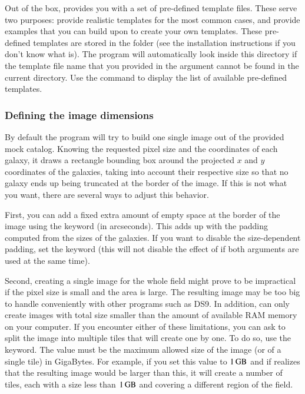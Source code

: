 Out of the box, \egg provides you with a set of pre-defined template files. These serve two purposes: provide realistic templates for the most common cases, and provide examples that you can build upon to create your own templates. These pre-defined templates are stored in the  folder (see the installation instructions if you don't know what  is). The program will automatically look inside this directory if the template file name that you provided in the  argument cannot be found in the current directory. Use the  command to display the list of available pre-defined templates.

\subsubsection{Defining the image dimensions}

By default the program will try to build one single image out of the provided mock catalog. Knowing the requested pixel size and the coordinates of each galaxy, it draws a rectangle bounding box around the projected $x$ and $y$ coordinates of the galaxies, taking into account their respective size so that no galaxy ends up being truncated at the border of the image. If this is not what you want, there are several ways to adjust this behavior.

First, you can add a fixed extra amount of empty space at the border of the image using the  keyword (in arcseconds). This adds up with the padding computed from the sizes of the galaxies. If you want to disable the size-dependent padding, set the  keyword (this will not disable the effect of  if both arguments are used at the same time).

Second, creating a single image for the whole field might prove to be impractical if the pixel size is small and the area is large. The resulting image may be too big to handle conveniently with other programs such as DS9. In addition, \skymaker can only create images with total size smaller than the amount of available RAM memory on your computer. If you encounter either of these limitations, you can ask  to split the image into multiple tiles that \skymaker will create one by one. To do so, use the  keyword. The value must be the maximum allowed size of the image (or of a single tile) in GigaBytes. For example, if you set this value to $1\,{\rm GB}$ and if  realizes that the resulting image would be larger than this, it will create a number of tiles, each with a size less than $1\,{\rm GB}$ and covering a different region of the field.

